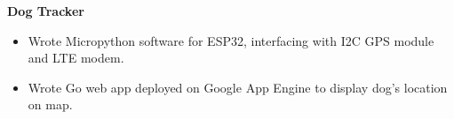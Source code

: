 \noindent \textbf{Dog Tracker}
\begin{itemize}
    \item Wrote Micropython software for ESP32, interfacing with I2C GPS module and LTE modem.
    \item Wrote Go web app deployed on Google App Engine to display dog's location on map.
\end{itemize}
